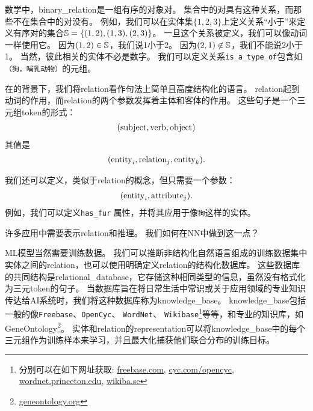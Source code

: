 数学中，\gls{binary_relation}是一组有序的对象对。
集合中的对具有这种关系，而那些不在集合中的对没有。
例如，我们可以在实体集$\{ 1, 2, 3 \}$上定义关系``小于''来定义有序对的集合$\mathbb{S} = \{ (1, 2), (1, 3), (2, 3) \}$。
一旦这个关系被定义，我们可以像动词一样使用它。
因为$(1, 2) \in \mathbb{S}$，我们说1小于2。
因为$(2, 1) \not \in \mathbb{S}$，我们不能说2小于1。
当然，彼此相关的实体不必是数字。
我们可以定义关系{\tt is\_a\_type\_of}包含如{\tt（狗，哺乳动物）}的元组。

在的背景下，我们将\gls{relation}看作句法上简单且高度结构化的语言。
\gls{relation}起到动词的作用，而\gls{relation}的两个参数发挥着主体和客体的作用。
这些句子是一个三元组\gls{token}的形式：
\begin{align}
({\rm subject}, {\rm verb}, {\rm object})
\end{align}
其值是
\begin{align}
  ({\rm entity}_i, {\rm relation}_j, {\rm entity}_k).
\end{align}

我们还可以定义，类似于\gls{relation}的概念，但只需要一个参数：
\begin{align}
  ( {\rm entity}_i, {\rm attribute}_j ).
\end{align}
例如，我们可以定义{\tt has\_fur} 属性，并将其应用于像{\tt 狗}这样的实体。

许多应用中需要表示\gls{relation}和推理。
我们如何在\gls{NN}中做到这一点？

\gls{ML}模型当然需要训练数据。
我们可以推断非结构化自然语言组成的训练数据集中实体之间的\gls{relation}，也可以使用明确定义\gls{relation}的结构化数据库。 
这些数据库的共同结构是\gls{relational_database}，它存储这种相同类型的信息，虽然没有格式化为三元\gls{token}的句子。
当数据库旨在将日常生活中常识或关于应用领域的专业知识传达给\gls{AI}系统时，我们将这种数据库称为\gls{knowledge_base}。
\gls{knowledge_base}包括一般的像{\tt Freebase}、{\tt OpenCyc}、 {\tt WordNet}、 {\tt Wikibase}\footnote{分别可以在如下网址获取: \url{freebase.com}, \url{cyc.com/opencyc},
\url{wordnet.princeton.edu}, \url{wikiba.se}}等等，和专业的知识库，如GeneOntology\footnote{\url{geneontology.org}}。
实体和\gls{relation}的\gls{representation}可以将\gls{knowledge_base}中的每个三元组作为训练样本来学习，并且最大化捕获他们联合分布的训练目标\citep{Bordes-et-al-LSML2013}。

